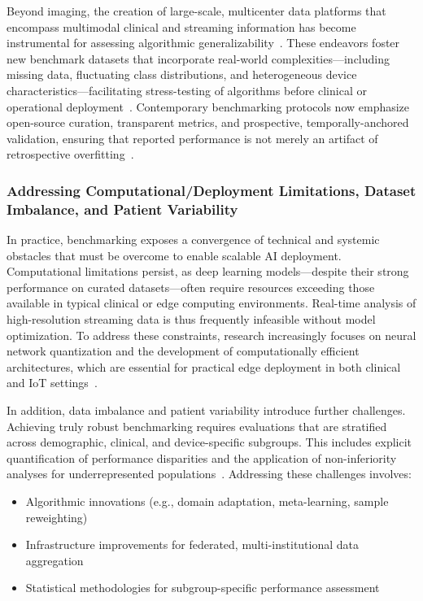 Beyond imaging, the creation of large-scale, multicenter data platforms that encompass multimodal clinical and streaming information has become instrumental for assessing algorithmic generalizability~\cite{ref34,ref35,ref37,ref45,ref48,ref65,ref83}. These endeavors foster new benchmark datasets that incorporate real-world complexities—including missing data, fluctuating class distributions, and heterogeneous device characteristics—facilitating stress-testing of algorithms before clinical or operational deployment~\cite{ref83}. Contemporary benchmarking protocols now emphasize open-source curation, transparent metrics, and prospective, temporally-anchored validation, ensuring that reported performance is not merely an artifact of retrospective overfitting~\cite{ref31,ref44,ref54}.

\subsubsection{Addressing Computational/Deployment Limitations, Dataset Imbalance, and Patient Variability}

In practice, benchmarking exposes a convergence of technical and systemic obstacles that must be overcome to enable scalable AI deployment. Computational limitations persist, as deep learning models—despite their strong performance on curated datasets—often require resources exceeding those available in typical clinical or edge computing environments. Real-time analysis of high-resolution streaming data is thus frequently infeasible without model optimization. To address these constraints, research increasingly focuses on neural network quantization and the development of computationally efficient architectures, which are essential for practical edge deployment in both clinical and IoT settings~\cite{ref98,ref102,ref103,ref106}.
 
In addition, data imbalance and patient variability introduce further challenges. Achieving truly robust benchmarking requires evaluations that are stratified across demographic, clinical, and device-specific subgroups. This includes explicit quantification of performance disparities and the application of non-inferiority analyses for underrepresented populations~\cite{ref89,ref106}. Addressing these challenges involves:

\begin{itemize}
    \item Algorithmic innovations (e.g., domain adaptation, meta-learning, sample reweighting)
    \item Infrastructure improvements for federated, multi-institutional data aggregation
    \item Statistical methodologies for subgroup-specific performance assessment~\cite{ref102,ref103}
\end{itemize}

